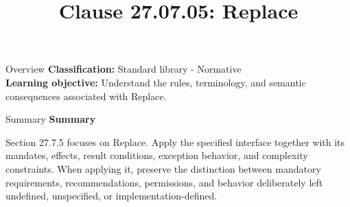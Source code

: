 \documentclass[10pt,letterpaper]{article}
\title{Clause 27.07.05: Replace}
\author{}
\date{}
\begin{document}
\maketitle
\begin{CornellOverviewBox}{Overview}
\textbf{Classification:} Standard library - Normative\\[2pt]
\textbf{Learning objective:} Understand the rules, terminology, and semantic consequences associated with Replace.
\end{CornellOverviewBox}\begin{CornellSummaryBox}{Summary}
{\sffamily\bfseries\color{Accent} Summary}\par\vspace{3pt}Section 27.7.5 focuses on Replace. Apply the specified interface together with its mandates, effects, result conditions, exception behavior, and complexity constraints. When applying it, preserve the distinction between mandatory requirements, recommendations, permissions, and behavior deliberately left undefined, unspecified, or implementation-defined.
\end{CornellSummaryBox}
\end{document}

